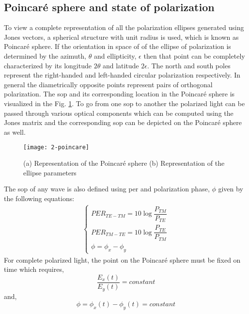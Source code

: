 \documentclass[../report.tex]{subfiles}
\begin{document}
		\subsection{Poincaré sphere and state of polarization} \label{concept:poincare_sphare}
To view a complete representation of all the polarization ellipses generated using Jones vectors, a spherical structure with unit radius is used, which is known as Poincaré sphere. If the orientation in space of of the ellipse of polarization is determined by the azimuth, $\theta$ and ellipticity, $\epsilon$ then that point can be completely characterized by its longitude $2\theta$ and latitude $2\epsilon$. The north and south poles represent the right-handed and left-handed circular polarization respectively. In general the diametrically opposite points represent pairs of orthogonal polarization. The \gls{sop} and its corresponding location in the Poincaré sphere is visualized in the Fig. \ref{fig:2_poincare}. To go from one \gls{sop} to another the polarized light can be passed through various optical components which can be computed using the Jones matrix and the corresponding \gls{sop} can be depicted on the Poincaré sphere as well.     
\begin{figure}[H]
	\centering
	\texttt{[image: 2-poincare]}
	\caption{(a) Representation of the Poincaré sphere (b) Representation of the ellipse parameters \cite{flossmann_stokes_2006}}
	\label{fig:2_poincare}
\end{figure}
\noindent The \gls{sop} of any wave is also defined using \gls{per} and polarization phase, $\phi$ given by the following equations:
\begin{equation}\label{eq:wave_sop}
\begin{aligned}
\begin{cases}
PER_{TE-TM} = 10\log \dfrac {P_{TM}} {P_{TE}}\\
PER_{TM-TE} = 10\log \dfrac {P_{TE}} {P_{TM}}\\
\phi =\phi _{x}-\phi _{y}
\end{cases}
\end{aligned}
\end{equation}
For complete polarized light, the point on the Poincaré sphere must be fixed on time which requires,
\begin{equation}\label{eq:polarization_condition_1}
\dfrac {E_{x}\left( t\right) } {E_{y}\left( t\right) }=constant
\end{equation}
and,
\begin{equation}\label{eq:polarization_condition_2}
\phi = \phi_{x}(t) - \phi_{y}(t)=constant
\end{equation}
\end{document}
